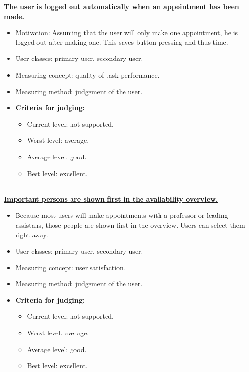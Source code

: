 \documentclass[11pt, a4paper,svglistings]{report}
\begin{document}
\textbf{\underline{The user is logged out automatically when an appointment has been made.}}
\begin{itemize}
\item{Motivation: Assuming that the user will only make one appointment, he is logged out after making one. This saves button pressing and thus time.}
\item{User classes: primary user, secondary user.}
\item{Measuring concept: quality of task performance.}
\item{Measuring method: judgement of the user.}
\item{\textbf{Criteria for judging:}}
\begin{itemize}
\item{Current level: not supported.}
\item{Worst level: average.}
\item{Average level: good.}
\item{Best level: excellent. \\ \\}
\end{itemize}
\end{itemize}
\textbf{\underline{Important persons are shown first in the availability overview.}}
\begin{itemize}
\item{Because most users will make appointments with a professor or leading assistans, those people are shown first in the overview. Users can select them right away.}
\item{User classes: primary user, secondary user.}
\item{Measuring concept: user satisfaction.}
\item{Measuring method: judgement of the user.}
\item{\textbf{Criteria for judging:}}
\begin{itemize}
\item{Current level: not supported.}
\item{Worst level: average.}
\item{Average level: good.}
\item{Best level: excellent. \\ \\}
\end{itemize}
\end{itemize}
\end{document}
